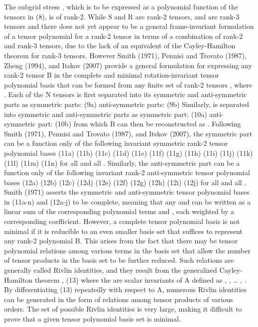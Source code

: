The subgrid stress  , which is to be expressed as a polynomial function of the tensors in (8), is of rank-2.  While S and R are rank-2 tensors,   and   are rank-3 tensors and there does not yet appear to be a general frame-invariant formulation of a tensor polynomial for a rank-2 tensor in terms of a combination of rank-2 and rank-3 tensors, due to the lack of an equivalent of the Cayley-Hamilton theorem for rank-3 tensors.  However Smith (1971), Pennisi and Trovato (1987), Zheng (1994), and Itskov (2007) provide a general formulation for expressing any rank-2 tensor B in the complete and minimal rotation-invariant tensor polynomial basis that can be formed from any finite set of rank-2 tensors  , where  .  
Each of the N tensors   is first separated into its symmetric and anti-symmetric parts as
	symmetric parts:	  	  	(9a)
	anti-symmetric parts:	 	  	(9b)
Similarly,   is separated into symmetric and anti-symmetric parts as
	symmetric part:	  	(10a)
	anti-symmetric part:	  	(10b)
from which B can then be reconstructed as  . Following Smith (1971), Pennisi and Trovato (1987), and Itskov (2007), the symmetric part   can be a function only of the following invariant symmetric rank-2 tensor polynomial bases
	 	(11a)
	 	(11b)
	 	(11c)
	 	(11d)
	 	(11e)
	 	(11f)
	 	(11g)
	 	(11h)
	 	(11i)
	 	(11j)
	 	(11k)
	 	(11l)
	 	(11m)
	 	(11n)
for all   and all  .  Similarly, the anti-symmetric part   can be a function only of the following invariant rank-2 anti-symmetric tensor polynomial bases
	 	(12a)
	 	(12b)
	 	(12c)
	 	(12d)
	 	(12e)
	 	(12f)
	 	(12g)
	 	(12h)
	 	(12i)
	 	(12j)
for all   and all  .  
Smith (1971) asserts the symmetric and anti-symmetric tensor polynomial bases in (11a-n) and (12a-j) to be complete, meaning that any   and   can be written as a linear sum of the corresponding polynomial terms   and  , each weighted by a corresponding coefficient. However, a complete tensor polynomial basis is not minimal if it is reducible to an even smaller basis set that suffices to represent any rank-2 polynomial B. This arises from the fact that there may be tensor polynomial relations among various terms in the basis set that allow the number of tensor products in the basis set to be further reduced. Such relations are generally called Rivlin identities, and they result from the generalized Cayley-Hamilton theorem 
  ,                            (13)
where the   are scalar invariants of A defined as  ,  , … ,  . By differentiating (13) repeatedly with respect to A, numerous Rivlin identities can be generated in the form of relations among tensor products of various orders. The set of possible Rivlin identities is very large, making it difficult to prove that a given tensor polynomial basis set is minimal. 
